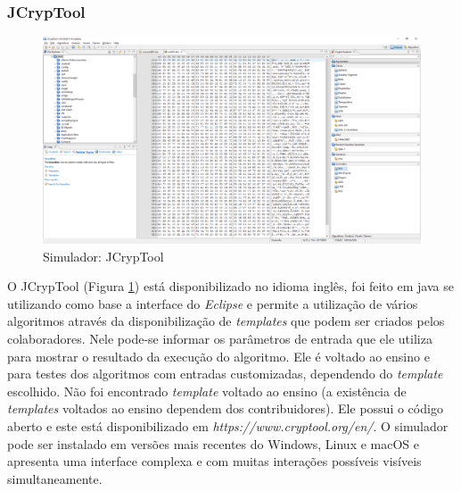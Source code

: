 \subsubsection{JCrypTool}

\begin{figure}[H]
    \centering
    \caption{Simulador: JCrypTool}
    \label{fig:jcryptool}
    \includegraphics[width=1\linewidth]{Simuladores/JCrypTool.png}
\end{figure}

O JCrypTool (Figura \ref{fig:jcryptool}) está disponibilizado no idioma inglês, foi feito em java se utilizando como base a interface do \textit{Eclipse} e permite a utilização de vários algoritmos através da disponibilização de \textit{templates} que podem ser criados pelos colaboradores. Nele pode-se informar os parâmetros de entrada que ele utiliza para mostrar o resultado da execução do algoritmo. Ele é voltado ao ensino e para testes dos algoritmos com entradas customizadas, dependendo do \textit{template} escolhido. Não foi encontrado \textit{template} voltado ao ensino (a existência de \textit{templates} voltados ao ensino dependem dos contribuidores). Ele possui o código aberto e este está disponibilizado em \textit{https://www.cryptool.org/en/}. O simulador pode ser instalado em versões mais recentes do Windows, Linux e macOS e apresenta uma interface complexa e com muitas interações possíveis visíveis simultaneamente. \cite{cryptool16}


